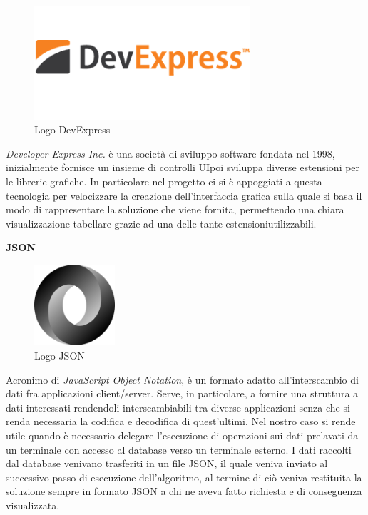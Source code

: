 \begin{figure}[H]
	\includegraphics[width=8cm]{immagini/devexpress.png}
	\centering
	\caption{Logo DevExpress}
\end{figure}

\textit{Developer Express Inc.} è una società di sviluppo software fondata nel 1998, inizialmente fornisce un insieme di controlli UI\glosp poi sviluppa diverse estensioni per le librerie grafiche.
In particolare nel progetto ci si è appoggiati a questa tecnologia per velocizzare la creazione dell'interfaccia grafica sulla quale si basa il modo di rappresentare la soluzione
che viene fornita, permettendo una chiara visualizzazione tabellare grazie ad una delle tante estensioni\glosp utilizzabili. 

\newpage
\textbf{JSON}

\begin{figure}[H]
	\includegraphics[width=3cm]{immagini/json.png}
	\centering
	\caption{Logo JSON}
\end{figure}

Acronimo di \textit{JavaScript Object Notation}, è un formato adatto all'interscambio di dati fra applicazioni client/server\glo.
Serve, in particolare, a fornire una struttura a dati interessati rendendoli interscambiabili tra diverse applicazioni senza che si renda necessaria la codifica e decodifica di quest'ultimi.
Nel nostro caso si rende utile quando è necessario delegare l'esecuzione di operazioni sui dati prelavati da un terminale con accesso al database verso un terminale esterno.
I dati raccolti dal database venivano trasferiti in un file JSON, il quale veniva inviato al successivo passo di esecuzione dell'algoritmo, al termine di ciò veniva restituita
la soluzione sempre in formato JSON a chi ne aveva fatto richiesta e di conseguenza visualizzata.\\

